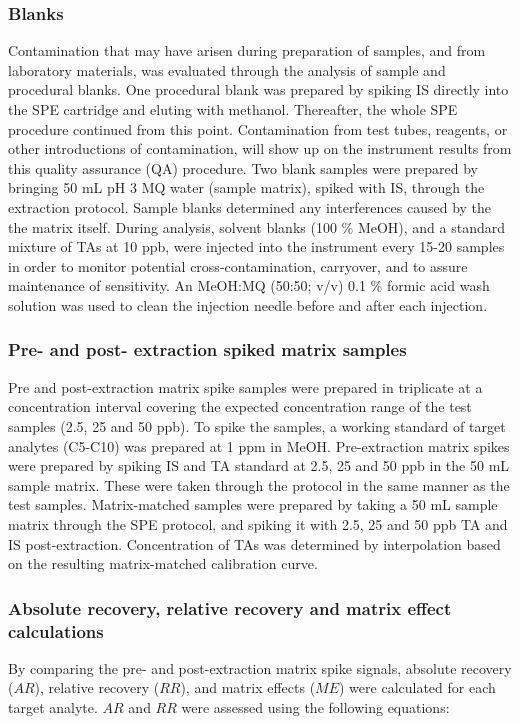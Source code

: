 \subsubsection{Blanks}
Contamination that may have arisen during preparation of samples, and from laboratory materials, was evaluated through the analysis of sample and procedural blanks. One procedural blank was prepared by spiking IS directly into the SPE cartridge and eluting with methanol. Thereafter, the whole SPE procedure continued from this point. Contamination from test tubes, reagents, or other introductions of contamination, will show up on the instrument results from this quality assurance (QA) procedure. Two blank samples were prepared by bringing 50 mL pH 3 MQ water (sample matrix), spiked with IS, through the extraction protocol. Sample blanks determined any interferences caused by the the matrix itself. During analysis, solvent blanks (100 \% MeOH), and a standard mixture of TAs at 10 ppb, were injected into the instrument every 15-20 samples in order to monitor potential cross-contamination, carryover, and to assure maintenance of sensitivity. An MeOH:MQ (50:50; v/v) 0.1 \% formic acid wash solution was used to clean the injection needle before and after each injection.

\subsubsection{Pre- and post- extraction spiked matrix samples}
Pre and post-extraction matrix spike samples were prepared in triplicate at a concentration interval covering the expected concentration range of the test samples (2.5, 25 and 50 ppb). To spike the samples, a working standard of target analytes (C5-C10) was prepared at 1 ppm in MeOH. Pre-extraction matrix spikes were prepared by spiking IS and \acrshort{TA} standard at 2.5, 25 and 50 ppb in the 50 mL sample matrix. These were taken through the protocol in the same manner as the test samples. Matrix-matched samples were prepared by taking a 50 mL sample matrix through the SPE protocol, and spiking it with 2.5, 25 and 50 ppb TA and IS post-extraction. Concentration of TAs was determined by interpolation based on the resulting matrix-matched calibration curve. 

\subsubsection{Absolute recovery, relative recovery and matrix effect calculations}
By comparing the pre- and post-extraction matrix spike signals, absolute recovery ($AR$), relative recovery ($RR$), and matrix effects ($ME$) were calculated for each target analyte. $AR$ and $RR$ were assessed using the following equations:

